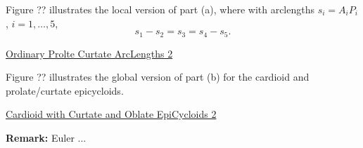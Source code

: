 \documentclass{ximera}
\begin{document}
Figure ?? illustrates the local version of part (a),  where with arclengths $s_i = A_iP_i$, $i=1,\ldots , 5$, 
\[
     s_1  -  s_2 = s_3 = s_4 -  s_5.  
\]

\begin{onlineOnly}
    \begin{center}
\end{center}
\end{onlineOnly}

\href{https://www.desmos.com/calculator/dfmyahqves}{Ordinary Prolte Curtate ArcLengths 2}











Figure ?? illustrates the global version of part (b) for the cardioid and prolate/curtate epicycloids.

\begin{onlineOnly}
    \begin{center}
\end{center}
\end{onlineOnly}

\href{https://www.desmos.com/calculator/xxybrtbt0o}{Cardioid with Curtate and Oblate EpiCycloids 2}

{\bf Remark:} Euler ...



\end{document}
